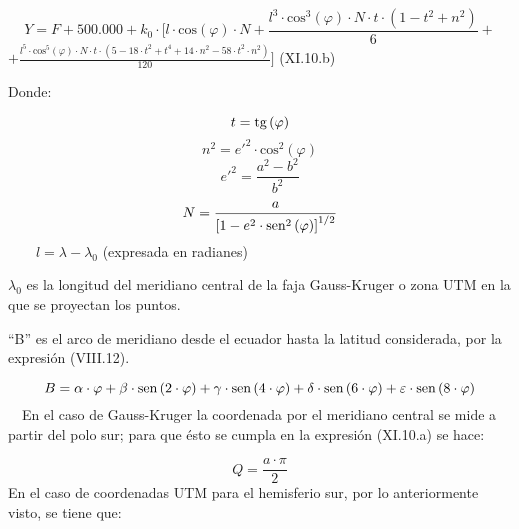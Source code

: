 \documentclass{tufte-book}
\newcommand\normalsubformula[1]{\text{\mathversion{normal}$#1$}}
\begin{document}
\begin{equation*}
{Y=F+\text{500}\text{.}\text{000}+k_{{0}}\cdot [l\cdot
\text{cos}\left(\varphi \right)\cdot N+\frac{l^{{3}}\cdot
\text{cos}^{{3}}\left(\varphi \right)\cdot N\cdot t\cdot
\left(1-t^{{2}}+n^{{2}}\right)}{6}+}
\end{equation*}
 ${+{\frac{l^{{5}}\cdot \text{cos}^{{5}}\left(\varphi \right)\cdot
N\cdot t\cdot \left(5-\text{18}\cdot t^{{2}}+t^{{4}}+\text{14}\cdot
n^{{2}}-\text{58}\cdot t^{{2}}\cdot n^{{2}}\right)}{\text{120}}}]}$ 
(XI.10.b)

Donde:

\begin{equation*}
{t=\normalsubformula{\text{tg}}\left(\varphi \right)}
\end{equation*}
\begin{equation*}
{n^{{2}}=e'^{{2}}\cdot \text{cos}^{{2}}\left(\varphi \right)}
\end{equation*}
\begin{equation*}
{e'^{{2}}=\frac{a^{{2}}-b^{{2}}}{b^{{2}}}}
\end{equation*}
\begin{equation*}
{N=\frac{a}{\left[1-e^{{2}}\cdot
\normalsubformula{\text{sen}}^{{2}}\left(\varphi
\right)\right]^{{1/2}}}}
\end{equation*}
\ \ \ \  ${l=\lambda -\lambda _{{0}}}$  (expresada en radianes)

 ${\lambda _{{0}}}$ es la longitud del meridiano central de la faja
Gauss-Kruger o zona UTM en la que se proyectan los puntos.

{\textquotedblleft}B{\textquotedblright} es el arco de meridiano desde
el ecuador hasta la latitud considerada, por la expresión (VIII.12).

\begin{equation*}
{B=\alpha \cdot \varphi +\beta \cdot
\normalsubformula{\text{sen}}\left(2\cdot \varphi \right)+\gamma \cdot
\normalsubformula{\text{sen}}\left(4\cdot \varphi \right)+\delta \cdot
\normalsubformula{\text{sen}}\left(6\cdot \varphi \right)+\varepsilon
\cdot \normalsubformula{\text{sen}}\left(8\cdot \varphi \right)}
\end{equation*}
\ \ En el caso de Gauss-Kruger la coordenada por el meridiano central se
mide a partir del polo sur; para que ésto se cumpla en la expresión
(XI.10.a) se hace:

\begin{equation*}
{Q=\frac{a\cdot \pi }{2}}
\end{equation*}
En el caso de coordenadas UTM para el hemisferio sur, por lo
anteriormente visto, se tiene que:
\end{document}
